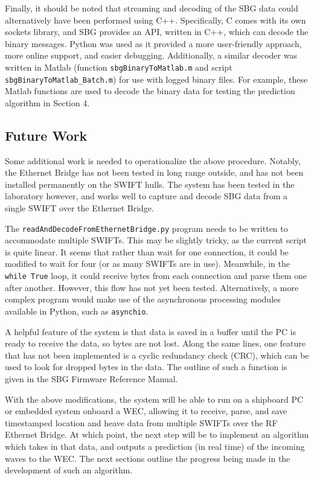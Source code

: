 \documentclass[11pt]{amsart}
\begin{document}
 
Finally, it should be noted that streaming and decoding of the SBG data could alternatively have been performed using C++.  Specifically, C comes with its own sockets library, and SBG provides an API, written in C++, which can decode the binary messages.  Python was used as it provided a more user-friendly approach, more online support, and easier debugging.  Additionally, a similar decoder was written in Matlab (function \texttt{sbgBinaryToMatlab.m} and script \texttt{sbgBinaryToMatlab\_Batch.m}) for use with logged binary files.  For example, these Matlab functions are used to decode the binary data for testing the prediction algorithm in Section 4.

\subsection{Future Work}

Some additional work is needed to operationalize the above procedure.  Notably, the Ethernet Bridge has not been tested in long range outside, and has not been installed permanently on the SWIFT hulls.  The system has been tested in the laboratory however, and works well to capture and decode SBG data from a single SWIFT over the Ethernet Bridge.  

The \texttt{readAndDecodeFromEthernetBridge.py} program needs to be written to accommodate multiple SWIFTs.  This may be slightly tricky, as the current script is quite linear.  It seems that rather than wait for one connection, it could be modified to wait for four (or as many SWIFTs are in use).  Meanwhile, in the \texttt{while True} loop, it could receive bytes from each connection and parse them one after another.  However, this flow has not yet been tested.  Alternatively, a more complex program would make use of the asynchronous processing modules available in Python, such as \texttt{asynchio}.

A helpful feature of the system is that data is saved in a buffer until the PC is ready to receive the data, so bytes are not lost.  Along the same lines, one feature that has not been implemented is a cyclic redundancy check (CRC), which can be used to look for dropped bytes in the data.  The outline of such a function is given in the SBG Firmware Reference Manual.

With the above modifications, the system will be able to run on a shipboard PC or embedded system onboard a WEC, allowing it to receive, parse, and save timestamped location and heave data from multiple SWIFTs over the RF Ethernet Bridge.  At which point, the next step will be to implement an algorithm which takes in that data, and outputs a prediction (in real time) of the incoming waves to the WEC.  The next sections outline the progress being made in the development of such an algorithm.
\end{document}
